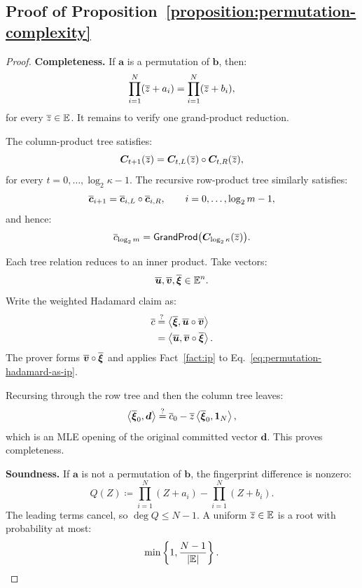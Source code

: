 \subsection{Proof of Proposition~\ref{proposition:permutation-complexity}}
\label{appx:proof-permutation}

\begin{proof}
\noindent\textbf{Completeness.}
If \(\bm a\) is a permutation of \(\bm b\), then:
\[
    \prod_{i=1}^{N}(\overline{z}+a_i)
    =
    \prod_{i=1}^{N}(\overline{z}+b_i),
\]
for every \(\overline{z}\in\mathbb{E}\). It remains to verify
one grand-product reduction.

The column-product tree satisfies:
\[
    \bm C_{t+1}(\overline{z})
    =
    \bm C_{t,L}(\overline{z})
    \circ
    \bm C_{t,R}(\overline{z}),
\]
for every
\(t=0,\ldots,\log_2\kappa-1\). The recursive row-product tree
similarly satisfies:
\[
    \overline{\bm c}_{i+1}
    =
    \overline{\bm c}_{i,L}
    \circ
    \overline{\bm c}_{i,R},
    \qquad
    i=0,\ldots,\log_2m-1,
\]
and hence:
\[
    \overline{c}_{\log_2m}
    =
    \mathsf{GrandProd}
    \bigl(
        \bm C_{\log_2\kappa}(\overline{z})
    \bigr).
\]

Each tree relation reduces to an inner product. Take vectors:
\[
    \overline{\bm u},
    \overline{\bm v},
    \overline{\bm\xi}
    \in\mathbb{E}^n.
\]
Write the weighted Hadamard claim as:
\begin{equation}
\begin{aligned}
    \overline{c}
    &\mathrel{\overset{\mathrm{?}}{=}}
    \left\langle
        \overline{\bm\xi},
        \overline{\bm u}\circ\overline{\bm v}
    \right\rangle\\
    &=
    \left\langle
        \overline{\bm u},
        \overline{\bm v}\circ\overline{\bm\xi}
    \right\rangle.
\end{aligned}
\label{eq:permutation-hadamard-as-ip}
\end{equation}
The prover forms
\(
    \overline{\bm v}\circ\overline{\bm\xi}
\)
and applies Fact~\ref{fact:ip} to
Eq.~\eqref{eq:permutation-hadamard-as-ip}.

Recursing through the row tree and then the column tree leaves:
\[
    \left\langle
        \overline{\bm\xi}_0,\bm d
    \right\rangle
    \mathrel{\overset{\mathrm{?}}{=}}
    \overline{c}_0
    -
    \overline{z}
    \left\langle
        \overline{\bm\xi}_0,\bm 1_N
    \right\rangle,
\]
which is an MLE opening of the original committed vector
\(\bm d\). This proves completeness.

\smallskip\noindent\textbf{Soundness.}
If \(\bm a\) is not a permutation of \(\bm b\), the fingerprint
difference is nonzero:
\[
    Q(Z)
    \coloneqq
    \prod_{i=1}^{N}(Z+a_i)
    -
    \prod_{i=1}^{N}(Z+b_i).
\]
The leading terms cancel, so \(\deg Q\leq N-1\). A uniform
\(\overline{z}\in\mathbb{E}\) is a root with probability at most:
\[
    \min\left\{
        1,
        \frac{N-1}{|\mathbb{E}|}
    \right\}.
\]


\end{proof}
